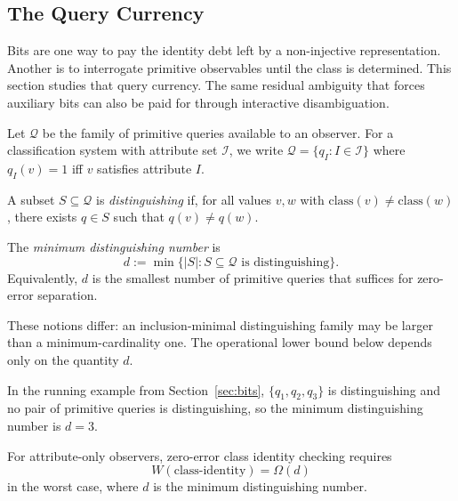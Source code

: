\subsection{The Query Currency}

Bits are one way to pay the identity debt left by a non-injective representation. Another is to interrogate primitive observables until the class is determined. This section studies that query currency. The same residual ambiguity that forces auxiliary bits can also be paid for through interactive disambiguation.

\begin{definition}
Let $\mathcal Q$ be the family of primitive queries available to an observer. For a classification system with attribute set $\mathcal I$, we write $\mathcal Q = \{q_I : I \in \mathcal I\}$ where $q_I(v)=1$ iff $v$ satisfies attribute $I$.
\end{definition}

\begin{definition}
A subset $S \subseteq \mathcal Q$ is \emph{distinguishing} if, for all values $v,w$ with $\mathrm{class}(v) \ne \mathrm{class}(w)$, there exists $q \in S$ such that $q(v) \ne q(w)$.
\end{definition}

\begin{definition}\label{def:distinguishing-dimension}
The \emph{minimum distinguishing number} is
\[
d := \min\{|S| : S \subseteq \mathcal Q \text{ is distinguishing}\}.
\]
Equivalently, $d$ is the smallest number of primitive queries that suffices for zero-error separation.
\end{definition}

\begin{remark}
These notions differ: an inclusion-minimal distinguishing family may be larger than a minimum-cardinality one. The operational lower bound below depends only on the quantity $d$.
\end{remark}

In the running example from Section~\ref{sec:bits}, $\{q_1,q_2,q_3\}$ is distinguishing and no pair of primitive queries is distinguishing, so the minimum distinguishing number is $d=3$.

\begin{theorem}\label{thm:interface-lower-bound}
For attribute-only observers, zero-error class identity checking requires
\[
W(\text{class-identity}) = \Omega(d)
\]
in the worst case, where $d$ is the minimum distinguishing number.
\end{theorem}

